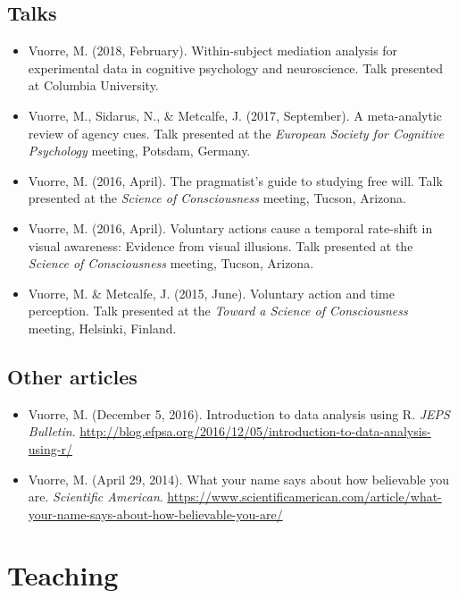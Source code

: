 \documentclass[12pt, a4paper]{article}
\newcommand{\years}[1]{\marginnote{\scriptsize #1}}
\begin{document}
\subsection*{Talks}
\begin{itemize}
\item \years{2018} Vuorre, M. (2018, February). Within-subject mediation analysis for experimental data in cognitive psychology and neuroscience. Talk presented at Columbia University.
\item \years{2017} Vuorre, M., Sidarus, N., \& Metcalfe, J. (2017, September). A meta-analytic review of agency cues. Talk presented at the \emph{European Society for Cognitive Psychology} meeting, Potsdam, Germany.
\item \years{2016} Vuorre, M. (2016, April). The pragmatist's guide to studying free will. Talk presented at the \emph{Science of Consciousness} meeting, Tucson, Arizona.
\item Vuorre, M. (2016, April). Voluntary actions cause a temporal rate-shift in visual awareness: Evidence from visual illusions. Talk presented at the \emph{Science of Consciousness} meeting, Tucson, Arizona.
\item \years{2015} Vuorre, M. \& Metcalfe, J. (2015, June). Voluntary action and time perception. Talk presented at the \emph{Toward a Science of Consciousness} meeting, Helsinki, Finland.
\end{itemize}

\subsection*{Other articles}
\begin{itemize}
\item \years{2016} Vuorre, M. (December 5, 2016). Introduction to data analysis using R. \emph{JEPS Bulletin}. \url{http://blog.efpsa.org/2016/12/05/introduction-to-data-analysis-using-r/}
\item \years{2014} Vuorre, M. (April 29, 2014). What your name says about how believable you are. \emph{Scientific American}. \url{https://www.scientificamerican.com/article/what-your-name-says-about-how-believable-you-are/}
\end{itemize}

\section*{Teaching}
\end{document}
